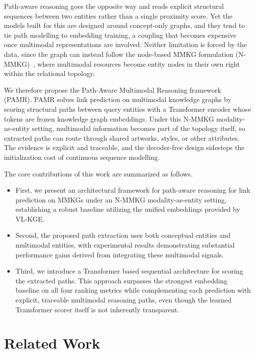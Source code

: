 \documentclass[runningheads]{llncs}
\begin{document}
Path-aware reasoning goes the opposite way and reads explicit structural sequences between two entities rather than a single proximity score. Yet the models built for this are designed around concept-only graphs, and they tend to tie path modelling to embedding training, a coupling that becomes expensive once multimodal representations are involved. Neither limitation is forced by the data, since the graph can instead follow the node-based MMKG formulation (N-MMKG)~\cite{zhu2024multimodal,liang2024survey}, where multimodal resources become entity nodes in their own right within the relational topology.

We therefore propose the Path-Aware Multimodal Reasoning framework (PAMR). PAMR solves link prediction on multimodal knowledge graphs by scoring structural paths between query entities with a Transformer encoder whose tokens are frozen knowledge graph embeddings. Under this N-MMKG modality-as-entity setting, multimodal information becomes part of the topology itself, so extracted paths can route through shared artworks, styles, or other attributes. The evidence is explicit and traceable, and the decoder-free design sidesteps the initialization cost of continuous sequence modelling.

The core contributions of this work are summarized as follows.

\begin{itemize}
  \item First, we present an architectural framework for path-aware reasoning for link prediction on MMKGs under an N-MMKG modality-as-entity setting, establishing a robust baseline utilizing the unified embeddings provided by VL-KGE.
  \item Second, the proposed path extraction uses both conceptual entities and multimodal entities, with experimental results demonstrating substantial performance gains derived from integrating these multimodal signals.
  \item Third, we introduce a Transformer based sequential architecture for scoring the extracted paths. This approach surpasses the strongest embedding baseline on all four ranking metrics while complementing each prediction with explicit, traceable multimodal reasoning paths, even though the learned Transformer scorer itself is not inherently transparent.
\end{itemize}

\section{Related Work}
\label{sec:related-work}
\end{document}
